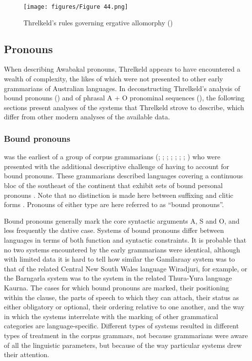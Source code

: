 \begin{figure}
\texttt{[image: figures/Figure 44.png]}
\caption{\label{fig:3:44}\label{fig:3.12} Threlkeld’s rules governing ergative allomorphy  (\citeyear[11]{threlkeld_australian_1834})}
\end{figure}

\subsection{Pronouns}
\label{sec:key:3.3.6}

When describing Awabakal pronouns, Threlkeld appears to have encountered a wealth of complexity, the likes of which were not presented to other early grammarians of Australian languages. In deconstructing Threlkeld’s analysis of bound pronouns () and of phrasal A + O pronominal sequences (), the following sections present analyses of the systems that Threlkeld strove to describe, which differ from other modern analyses of the available data.

\subsubsection{Bound pronouns}
\label{sec:key:3.3.6.1}

\citet{threlkeld_australian_1834} was the earliest of a group of corpus grammarians (\citealt{gunther_native_1838}; \citealt{gunther_lecture_1840}; \citealt{teichelmann_outlines_1840}; \citealt{meyer_vocabulary_1843}; \citealt{schurmann_vocabulary_1844}; \citealt{hale_languages_1846}; \citealt{ridley_kamilaroi_1866}; \citealt{ridley_kamilaroi_1875}) who were presented with the additional descriptive challenge of having to account for bound pronouns. These grammarians described languages covering a continuous bloc of the southeast of the continent that exhibit sets of bound personal pronouns \citep[337--401]{dixon_australian_2002}. Note that no distinction is made here between suffixing and clitic forms \citep[353]{dixon_australian_2002}. Pronouns of either type are here referred to as ``bound pronouns''.

Bound pronouns generally mark the core syntactic arguments A, S and O, and less frequently the dative case. Systems of bound pronouns differ between languages in terms of both function and syntactic constraints. It is probable that no two systems encountered by the early grammarians were identical, although with limited data it is hard to tell how similar the Gamilaraay system was to that of the related Central New South Wales language Wiradjuri, for example, or the Barngarla system was to the system in the related Thura-Yura language Kaurna. The cases for which bound pronouns are marked, their positioning within the clause, the parts of speech to which they can attach, their status as either obligatory or optional, their ordering relative to one another, and the way in which the systems interrelate with the marking of other grammatical categories are language-specific. Different types of systems resulted in different types of treatment in the corpus grammars, not because grammarians were aware of all the linguistic parameters, but because of the way particular systems drew their attention. 

